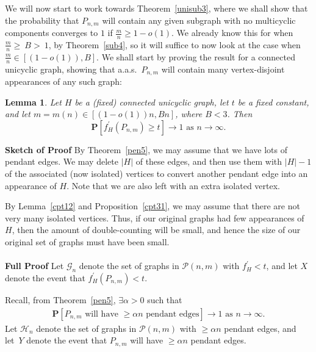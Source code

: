 \documentclass{article}
\newtheorem{Lemma}[Theorem]{Lemma}
\newtheorem{Proof of Theorem}{Proof of Theorem}
\begin{document}
We will now start to work towards Theorem~\ref{unisub3},
where we shall show that the probability that $P_{n,m}$ 
will contain any given subgraph with no multicyclic components converges to $1$
if $\frac{m}{n} \!\geq\! 1-o(1)$. 
We already know this for when~$\!\frac{m}{n} \!\geq~\!\!B\!>~\!\!1$,
by Theorem~\ref{sub4},
so it will suffice to now look at the case when $\frac{m}{n} \in [(1-o(1)), B]$.
We shall start by proving the result for a connected unicyclic graph,
showing that a.a.s.~$P_{n,m}$ will contain many vertex-disjoint appearances of any such graph: \\
















\begin{Lemma} \label{unisub1}
Let $H$ be a (fixed) connected unicyclic graph,
let $t$ be a fixed constant,
and let $m=m(n) \in [(1-o(1))n, Bn]$, where $B<3$.
Then
\begin{displaymath}
\mathbf{P}[f^{\prime}_{H}(P_{n,m}) \geq t] \to 1 
\textrm{ as } n \to \infty.
\end{displaymath} 
\end{Lemma}
\textbf{Sketch of Proof}
By Theorem~\ref{pen5},
we may assume that we have lots of pendant edges.
We may delete $|H|$ of these edges,
and then use them with $|H|-1$ of the associated (now isolated) vertices
to convert another pendant edge into an appearance of $H$.
Note that we are also left with an extra isolated vertex.

By Lemma~\ref{cpt12} and Proposition~\ref{cpt31},
we may assume that there are not very many isolated vertices.
Thus, if our original graphs had few appearances of $H$,
then the amount of double-counting will be small,
and hence the size of our original set of graphs must have been small. \\
\\
\textbf{Full Proof}
Let $\mathcal{G}_{n}$ denote the set of graphs in $\mathcal{P}(n,m)$ 
with $f^{\prime}_{H} < t$,
and let $X$ denote the event that $f_{H}^{\prime}(P_{n,m}) < t$.

Recall, from Theorem~\ref{pen5},
$\exists \alpha >0$ such that
\begin{eqnarray}
\mathbf{P}[P_{n,m} 
\textrm{ will have $\geq \alpha n$ pendant edges}] \to 1 
\textrm{ as } n \to \infty. \label{eq:u*}
\end{eqnarray} 
Let $\mathcal{H}_{n}$ denote the set of graphs in $\mathcal{P}(n,m)$
with $\geq \alpha n$ pendant edges,
and let~$Y$ denote the event that $P_{n,m}$ will have $\geq \alpha n$ pendant edges.
\end{document}

